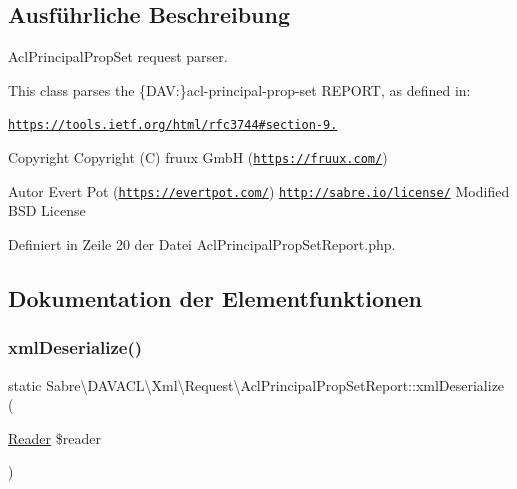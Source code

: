 \subsection{Ausführliche Beschreibung}
Acl\+Principal\+Prop\+Set request parser.

This class parses the \{D\+AV\+:\}acl-\/principal-\/prop-\/set R\+E\+P\+O\+RT, as defined in\+:

\href{https://tools.ietf.org/html/rfc3744#section-9.2}{\tt https\+://tools.\+ietf.\+org/html/rfc3744\#section-\/9.}

\begin{DoxyCopyright}{Copyright}
Copyright (C) fruux GmbH (\href{https://fruux.com/}{\tt https\+://fruux.\+com/}) 
\end{DoxyCopyright}
\begin{DoxyAuthor}{Autor}
Evert Pot (\href{https://evertpot.com/}{\tt https\+://evertpot.\+com/})  \href{http://sabre.io/license/}{\tt http\+://sabre.\+io/license/} Modified B\+SD License 
\end{DoxyAuthor}


Definiert in Zeile 20 der Datei Acl\+Principal\+Prop\+Set\+Report.\+php.



\subsection{Dokumentation der Elementfunktionen}
\mbox{\label{class_sabre_1_1_d_a_v_a_c_l_1_1_xml_1_1_request_1_1_acl_principal_prop_set_report_a0e9ad784558bd4c3b60dfadf35c3bb8e}} 
\subsubsection{\texorpdfstring{xml\+Deserialize()}{xmlDeserialize()}}
{\footnotesize\ttfamily static Sabre\textbackslash{}\+D\+A\+V\+A\+C\+L\textbackslash{}\+Xml\textbackslash{}\+Request\textbackslash{}\+Acl\+Principal\+Prop\+Set\+Report\+::xml\+Deserialize (\begin{DoxyParamCaption}\item[{\mbox{\hyperlink{class_sabre_1_1_xml_1_1_reader}{Reader}}}]{\$reader }\end{DoxyParamCaption})\hspace{0.3cm}{\ttfamily [static]}}

